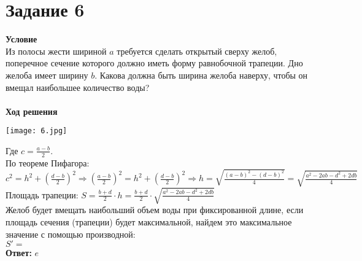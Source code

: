 
\newpage
\section{Задание 6}
{\bf\large Условие}\\
Из полосы жести шириной $a$ требуется сделать открытый сверху
желоб, поперечное сечение которого должно иметь форму равнобочной
трапеции. Дно желоба имеет ширину $b$. Какова должна быть ширина
желоба наверху, чтобы он вмещал наибольшее количество воды? \\
\\
{\bf\large Ход решения}
\begin{center}\texttt{[image: 6.jpg]}\end{center}
Где $c = \frac{a-b}{2}$. \\
По теореме Пифагора: $c^2 = h^2 + \left(\frac{d-b}{2}\right)^2 \Rightarrow \left(\frac{a-b}{2}\right)^2 = h^2 + \left(\frac{d-b}{2}\right)^2
\Rightarrow h = \sqrt{\frac{(a-b)^2-(d-b)^2}{4}} = \sqrt{\frac{a^2-2ab-d^2+2db}{4}}$ \\
Площадь трапеции: $S = \frac{b+d}{2}\cdot h = \frac{b+d}{2} \cdot \sqrt{\frac{a^2-2ab-d^2+2db}{4}}$ \\
Желоб будет вмещать наибольший объем воды при фиксированной длине, если площадь сечения (трапеции) будет максимальной, найдем это максимальное значение с помощью производной: \\
$S' = $
\\
{\bf Ответ:} $e$

